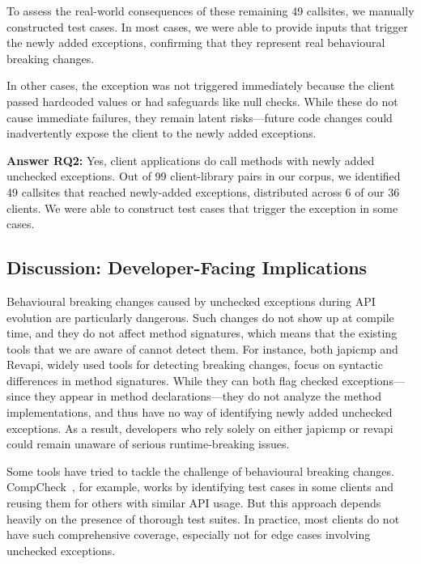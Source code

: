 To assess the real-world consequences of these remaining 49 callsites, we manually constructed test cases. In most cases, we were able to provide inputs that trigger the newly added exceptions, confirming that they represent real behavioural breaking changes.

In other cases, the exception was not triggered immediately because the client passed hardcoded values or had safeguards like null checks. While these do not cause immediate failures, they remain latent risks—future code changes could inadvertently expose the client to the newly added exceptions.

\vspace{1em}
\begin{tcolorbox}[colback=gray!10, colframe=black]
\textbf{Answer RQ2:} Yes, client applications do call methods with newly added unchecked exceptions. Out of 99 client-library pairs in our corpus, we identified 49 callsites that reached newly-added exceptions, distributed across 6 of our 36 clients. We were able to construct test cases that trigger the exception in some cases.
\end{tcolorbox}
\vspace{1em}

\subsection{Discussion: Developer-Facing Implications}

Behavioural breaking changes caused by unchecked exceptions during API evolution are particularly dangerous. Such changes do not show up at compile time, and they do not affect method signatures, which means that the existing tools that we are aware of cannot detect them. For instance, both japicmp and Revapi, widely used tools for detecting breaking changes, focus on syntactic differences in method signatures. While they can both flag checked exceptions—since they appear in method declarations—they do not analyze the method implementations, and thus have no way of identifying newly added unchecked exceptions. As a result, developers who rely solely on either japicmp or revapi could remain unaware of serious runtime-breaking issues.

Some tools have tried to tackle the challenge of behavioural breaking changes. CompCheck~\cite{CompCheck}, for example, works by identifying test cases in some clients and reusing them for others with similar API usage. But this approach depends heavily on the presence of thorough test suites. In practice, most clients do not have such comprehensive coverage, especially not for edge cases involving unchecked exceptions.

